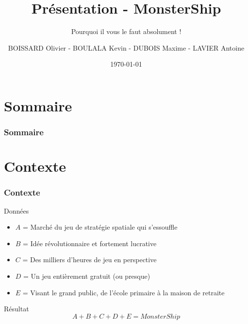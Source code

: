 \documentclass{beamer}
\title[Présentation - MonsterShip]{Présentation - MonsterShip}
\subtitle[\dots]{Pourquoi il vous le faut absolument !}
\author[Olivier - Kevin - Maxime - Antoine]{BOISSARD Olivier - BOULALA Kevin - DUBOIS Maxime - LAVIER Antoine}
\institute[UFR ST]{UFR ST - Besançon\\Projet de PAD}
\date{\today}
\begin{document}
	\frame{\titlepage}
	
	\section*{Sommaire}
		\begin{frame}
			\frametitle{Sommaire}
			\tableofcontents
		\end{frame}
		
	\section{Contexte}
		\begin{frame}
			\frametitle{Contexte}
			\begin{block}{Données}
				\begin{itemize}
					\item $A$ = Marché du jeu de stratégie spatiale qui s'essouffle
					\item $B$ = Idée révolutionnaire et fortement lucrative
					\item $C$ = Des milliers d'heures de jeu en perspective
					\item $D$ = Un jeu entièrement gratuit (ou presque)
					\item $E$ = Visant le grand public, de l'école primaire à la maison de retraite
				\end{itemize}
			\end{block}
			
			\begin{alertblock}{Résultat}
				\[
					A + B + C + D + E = MonsterShip
				\]
			\end{alertblock}
		\end{frame}
\end{document}
